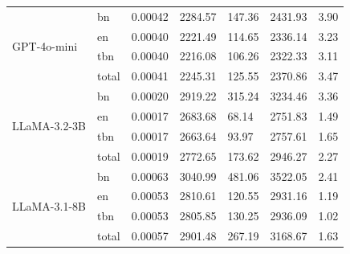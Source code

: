 \documentclass[11pt]{article}
\begin{document}
\begin{table}[h]
{\begin{tabular}{l l l l l l l}
\multirow{4}{*}{GPT-4o-mini}    & bn                             & 0.00042           & 2284.57                   & 147.36                    & 2431.93                  & 3.90                       \\
                                & en                             & 0.00040           & 2221.49                   & 114.65                    & 2336.14                  & 3.23                       \\
                                & tbn                            & 0.00040           & 2216.08                   & 106.26                    & 2322.33                  & 3.11                       \\
                                & total                          & 0.00041           & 2245.31                   & 125.55                    & 2370.86                  & 3.47                       \\
\midrule
\multirow{4}{*}{LLaMA-3.2-3B} & bn                             & 0.00020           & 2919.22                   & 315.24                    & 3234.46                  & 3.36                       \\
                                   & en                             & 0.00017           & 2683.68                   & 68.14                     & 2751.83                  & 1.49                       \\
                                   & tbn                            & 0.00017           & 2663.64                   & 93.97                     & 2757.61                  & 1.65                       \\
                                   & total                          & 0.00019           & 2772.65                   & 173.62                    & 2946.27                  & 2.27                       \\
\midrule
\multirow{4}{*}{LLaMA-3.1-8B} & bn                             & 0.00063           & 3040.99                   & 481.06                    & 3522.05                  & 2.41                       \\
                                   & en                             & 0.00053           & 2810.61                   & 120.55                    & 2931.16                  & 1.19                       \\
                                   & tbn                            & 0.00053           & 2805.85                   & 130.25                    & 2936.09                  & 1.02                       \\
                                   & total                          & 0.00057           & 2901.48                   & 267.19                    & 3168.67                  & 1.63                       \\
\midrule


\end{tabular}}
\end{table}
\end{document}
